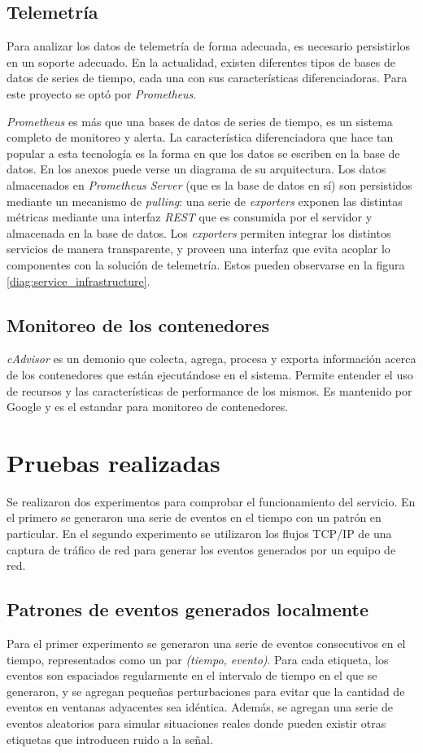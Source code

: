 \documentclass[a4paper,10pt, oneside]{article}
\begin{document}
\subsection{Telemetría}
Para analizar los datos de telemetría de forma adecuada, es necesario persistirlos en un soporte adecuado. En la actualidad, existen diferentes tipos de bases de datos de series de tiempo, cada una con sus características diferenciadoras. Para este proyecto se optó por \textit{Prometheus}.
\

\textit{Prometheus} es más que una bases de datos de series de tiempo, es un sistema completo de monitoreo y alerta. La característica diferenciadora que hace tan popular a esta tecnología es la forma en que los datos se escriben en la base de datos. En los anexos puede verse un diagrama de su arquitectura. Los datos almacenados en \textit{Prometheus Server} (que es la base de datos en sí) son persistidos mediante un mecanismo de \textit{pulling}: una serie de \textit{exporters} exponen las distintas métricas mediante una interfaz \textit{REST} que es consumida por el servidor y almacenada en la base de datos. Los \textit{exporters} permiten integrar los distintos servicios de manera transparente, y proveen una interfaz que evita acoplar lo componentes con la solución de telemetría. Estos pueden observarse en la figura \ref{diag:service_infrastructure}.

\subsection{Monitoreo de los contenedores}
\textit{cAdvisor} es un demonio que colecta, agrega, procesa y exporta información acerca de los contenedores que están ejecutándose en el sistema. Permite entender el uso de recursos y las características de performance de los mismos. Es mantenido por Google y es el estandar para monitoreo de contenedores.


\newpage

\section{Pruebas realizadas}
Se realizaron dos experimentos para comprobar el funcionamiento del servicio. En el primero se generaron una serie de eventos en el tiempo con un patrón en particular. En el segundo experimento se utilizaron los flujos TCP/IP de una captura de tráfico de red para generar los eventos generados por un equipo de red. 

\subsection{Patrones de eventos generados localmente}
Para el primer experimento se generaron una serie de eventos consecutivos en el tiempo, representados como un par \textit{(tiempo, evento)}. Para cada etiqueta, los eventos son espaciados regularmente en el intervalo de tiempo en el que se generaron, y se agregan pequeñas perturbaciones para evitar que la cantidad de eventos en ventanas adyacentes sea idéntica. Además, se agregan una serie de eventos aleatorios para simular situaciones reales donde pueden existir otras etiquetas que introducen ruido a la señal.
\end{document}
